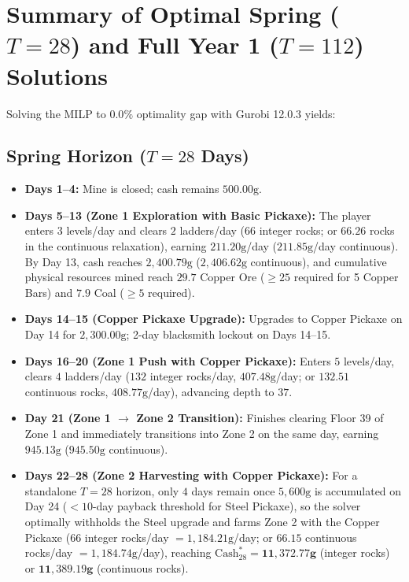 \documentclass[11pt,a4paper]{article}
\begin{document}
\section{Summary of Optimal Spring ($T = 28$) and Full Year 1 ($T = 112$) Solutions}
Solving the MILP to $0.0\%$ optimality gap with Gurobi 12.0.3 yields:

\subsection{Spring Horizon ($T = 28$ Days)}
\begin{itemize}
    \item \textbf{Days 1--4:} Mine is closed; cash remains $500.00\text{g}$.
    \item \textbf{Days 5--13 (Zone 1 Exploration with Basic Pickaxe):} The player enters $3$ levels/day and clears $2$ ladders/day ($66$ integer rocks; or $66.26$ rocks in the continuous relaxation), earning $211.20\text{g}$/day ($211.85\text{g}$/day continuous). By Day 13, cash reaches $2,400.79\text{g}$ ($2,406.62\text{g}$ continuous), and cumulative physical resources mined reach $29.7$ Copper Ore ($\ge 25$ required for 5 Copper Bars) and $7.9$ Coal ($\ge 5$ required).
    \item \textbf{Days 14--15 (Copper Pickaxe Upgrade):} Upgrades to Copper Pickaxe on Day 14 for $2,300.00\text{g}$; 2-day blacksmith lockout on Days 14--15.
    \item \textbf{Days 16--20 (Zone 1 Push with Copper Pickaxe):} Enters $5$ levels/day, clears $4$ ladders/day ($132$ integer rocks/day, $407.48\text{g}$/day; or $132.51$ continuous rocks, $408.77\text{g}$/day), advancing depth to $37$.
    \item \textbf{Day 21 (Zone 1 $\to$ Zone 2 Transition):} Finishes clearing Floor 39 of Zone 1 and immediately transitions into Zone 2 on the same day, earning $945.13\text{g}$ ($945.50\text{g}$ continuous).
    \item \textbf{Days 22--28 (Zone 2 Harvesting with Copper Pickaxe):} For a standalone $T=28$ horizon, only $4$ days remain once $5,600\text{g}$ is accumulated on Day 24 ($< 10$-day payback threshold for Steel Pickaxe), so the solver optimally withholds the Steel upgrade and farms Zone 2 with the Copper Pickaxe ($66$ integer rocks/day $= 1,184.21\text{g}$/day; or $66.15$ continuous rocks/day $= 1,184.74\text{g}$/day), reaching $\text{Cash}_{28}^* = \mathbf{11,372.77\text{g}}$ (integer rocks) or $\mathbf{11,389.19\text{g}}$ (continuous rocks).
\end{itemize}
\end{document}

